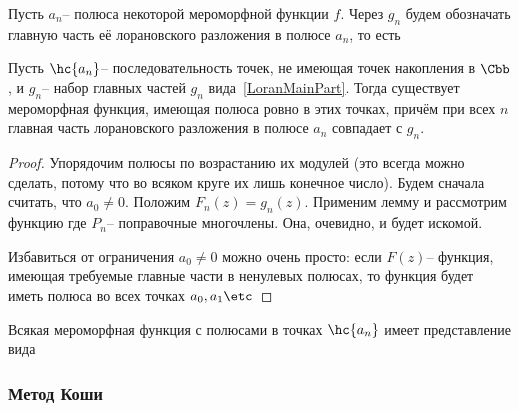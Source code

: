 \documentclass[a4paper]{article}
\begin{document}
Пусть $a_n$-- полюса некоторой мероморфной функции $f$. Через $g_n$ будем обозначать
главную часть её лорановского разложения в полюсе $a_n$, то есть

\begin{theorem}
Пусть $\hc{a_n}$-- последовательность точек, не имеющая точек накопления в $\Cbb$, и $g_n$-- набор
главных частей $g_n$ вида~\eqref{LoranMainPart}. Тогда существует
мероморфная функция, имеющая полюса ровно в этих точках, причём при всех $n$ главная часть лорановского
разложения в полюсе $a_n$ совпадает с $g_n$.
\end{theorem}
\begin{proof}
Упорядочим полюсы по возрастанию их модулей (это всегда можно сделать, потому что
во всяком круге их лишь конечное число).
Будем сначала считать, что $a_0 \neq 0$. Положим $F_n(z) = g_n(z)$. Применим лемму и рассмотрим
функцию
где $P_n$-- поправочные многочлены. Она, очевидно, и будет искомой.

Избавиться от ограничения $a_0 \neq 0$ можно очень просто: если $F(z)$-- функция, имеющая требуемые
главные части в ненулевых полюсах, то функция
будет иметь полюса во всех точках $a_0,a_1\etc$
\end{proof}

\begin{imp}
Всякая мероморфная функция с полюсами в точках $\hc{a_n}$ имеет представление вида
\end{imp}

\subsubsection{Метод Коши}
\end{document}
